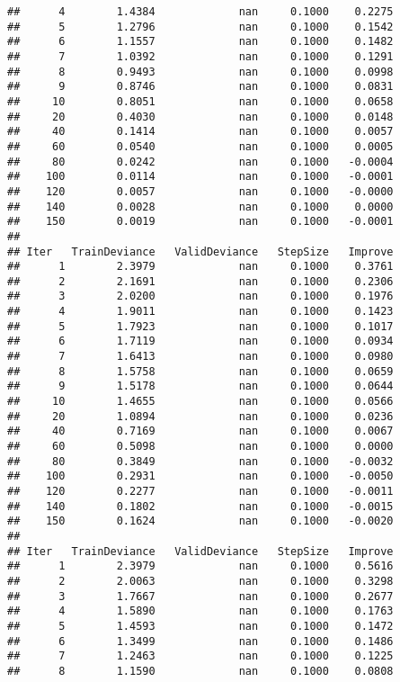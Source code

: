 \documentclass[]{article}
\begin{document}
\begin{verbatim}
##      4        1.4384             nan     0.1000    0.2275
##      5        1.2796             nan     0.1000    0.1542
##      6        1.1557             nan     0.1000    0.1482
##      7        1.0392             nan     0.1000    0.1291
##      8        0.9493             nan     0.1000    0.0998
##      9        0.8746             nan     0.1000    0.0831
##     10        0.8051             nan     0.1000    0.0658
##     20        0.4030             nan     0.1000    0.0148
##     40        0.1414             nan     0.1000    0.0057
##     60        0.0540             nan     0.1000    0.0005
##     80        0.0242             nan     0.1000   -0.0004
##    100        0.0114             nan     0.1000   -0.0001
##    120        0.0057             nan     0.1000   -0.0000
##    140        0.0028             nan     0.1000    0.0000
##    150        0.0019             nan     0.1000   -0.0001
## 
## Iter   TrainDeviance   ValidDeviance   StepSize   Improve
##      1        2.3979             nan     0.1000    0.3761
##      2        2.1691             nan     0.1000    0.2306
##      3        2.0200             nan     0.1000    0.1976
##      4        1.9011             nan     0.1000    0.1423
##      5        1.7923             nan     0.1000    0.1017
##      6        1.7119             nan     0.1000    0.0934
##      7        1.6413             nan     0.1000    0.0980
##      8        1.5758             nan     0.1000    0.0659
##      9        1.5178             nan     0.1000    0.0644
##     10        1.4655             nan     0.1000    0.0566
##     20        1.0894             nan     0.1000    0.0236
##     40        0.7169             nan     0.1000    0.0067
##     60        0.5098             nan     0.1000    0.0000
##     80        0.3849             nan     0.1000   -0.0032
##    100        0.2931             nan     0.1000   -0.0050
##    120        0.2277             nan     0.1000   -0.0011
##    140        0.1802             nan     0.1000   -0.0015
##    150        0.1624             nan     0.1000   -0.0020
## 
## Iter   TrainDeviance   ValidDeviance   StepSize   Improve
##      1        2.3979             nan     0.1000    0.5616
##      2        2.0063             nan     0.1000    0.3298
##      3        1.7667             nan     0.1000    0.2677
##      4        1.5890             nan     0.1000    0.1763
##      5        1.4593             nan     0.1000    0.1472
##      6        1.3499             nan     0.1000    0.1486
##      7        1.2463             nan     0.1000    0.1225
##      8        1.1590             nan     0.1000    0.0808

\end{verbatim}
\end{document}
